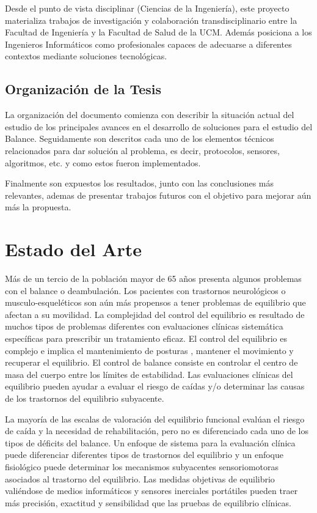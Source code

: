 \documentclass[12pt,a4paper]{article}
\begin{document}
Desde el punto de vista disciplinar (Ciencias de la Ingeniería), este proyecto materializa trabajos de investigación y colaboración transdisciplinario entre la Facultad de Ingeniería y la Facultad de Salud de la UCM. Además posiciona a los Ingenieros Informáticos como profesionales capaces de adecuarse a diferentes contextos mediante soluciones tecnológicas.

\subsection{Organizaci\'on de la Tesis}
La organización del documento comienza con describir la situación actual del estudio de los principales avances en el desarrollo de soluciones para el estudio del Balance. Seguidamente son descritos cada uno de los elementos técnicos relacionados para dar solución al problema, es decir,  protocolos, sensores, algoritmos, etc. y como estos fueron implementados.

Finalmente son expuestos los resultados, junto con las conclusiones más relevantes, ademas de presentar trabajos futuros con el objetivo para mejorar aún más la propuesta.


\section{Estado del Arte}
Más de un tercio de la población mayor de 65 años presenta algunos problemas con el balance o deambulación. Los pacientes con trastornos neurológicos o musculo-esqueléticos son aún más propensos a tener problemas de equilibrio que afectan a su movilidad. La complejidad del control del equilibrio es resultado  de muchos tipos de problemas diferentes con evaluaciones clínicas sistemática específicas para prescribir un tratamiento eficaz.
El control del equilibrio es complejo e implica el mantenimiento de posturas \cite{mancini_relevance_2010}, mantener el movimiento y recuperar el equilibrio. El control de balance consiste en controlar el centro de masa del cuerpo entre los límites de estabilidad. Las evaluaciones clínicas del equilibrio pueden ayudar a evaluar el riesgo de caídas y/o determinar las causas de los trastornos del equilibrio subyacente.

La mayoría de las escalas de valoración del equilibrio funcional evalúan el riesgo de caída y la necesidad de rehabilitación, pero no es diferenciado cada uno de los tipos de déficits del balance. Un enfoque de sistema para la evaluación clínica puede diferenciar diferentes tipos de trastornos del equilibrio y un enfoque fisiológico puede determinar los mecanismos subyacentes sensoriomotoras asociados al trastorno del equilibrio. Las medidas objetivas de equilibrio valiéndose de medios informáticos y sensores inerciales portátiles pueden traer más precisión, exactitud y sensibilidad que las pruebas de equilibrio clínicas.
\end{document}
